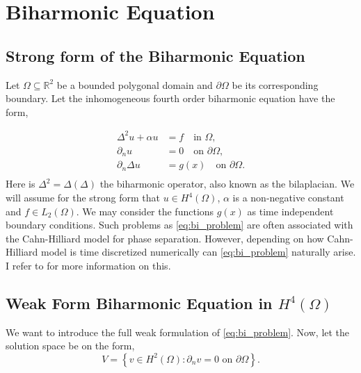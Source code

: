 \newpage
\section{ Biharmonic Equation}
\label{sec:ch1}


\subsection{Strong form of the Biharmonic Equation}%
\label{sub:strong_form_of_the_biharmonic_equation}

Let $\Omega \subseteq    \mathbb{R} ^2$ be a bounded polygonal domain and $\partial \Omega $ be its corresponding boundary. Let the inhomogeneous fourth order biharmonic equation have the form,

\begin{equation}
\label{eq:bi_problem}
\begin{split}
    \Delta^2  u  + \alpha  u  & = f \quad \text{in } \Omega,   \\
    \partial _{n} u & = 0  \quad \text{on } \partial \Omega,  \\
    \partial _{n} \Delta  u & = g(x)  \quad \text{on } \partial \Omega .  \\
\end{split}
\end{equation}
Here is $\Delta ^2 = \Delta  \left( \Delta  \right) $ the biharmonic operator, also known as the bilaplacian. We will assume for the strong form that $u \in H^{4}\left( \Omega  \right) $, $\alpha $ is a non-negative constant and $f \in L_{2}\left( \Omega  \right)
$. We may consider the functions $g( x ) $ as time independent boundary conditions. Such problems as \eqref{eq:bi_problem} are often associated with the Cahn-Hilliard model
\cite{cahnhilliard1957} for phase separation. However, depending on how Cahn-Hilliard model is time discretized numerically can
\eqref{eq:bi_problem} naturally arise. I refer to \cite{brenner2012quadratic} for more information on this.

\subsection{  Weak Form Biharmonic Equation in $H^{4}\left( \Omega  \right) $}%
\label{sub:continious_weak_form_of_biharmonic_equation}


We want to introduce the full weak formulation of \eqref{eq:bi_problem}. Now, let the solution space be on the form,
\begin{equation*}
V = \left\{ v \in H^2\left( \Omega  \right) : \partial _{n} v = 0  \text{ on }
\partial \Omega  \right\}.
\end{equation*}

